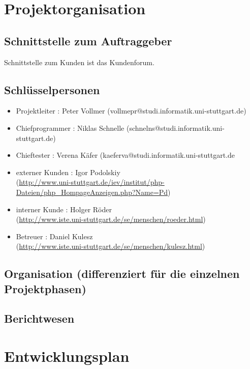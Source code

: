 \documentclass[a4paper,10pt]{scrartcl}
\begin{document}
\section{Projektorganisation}
\subsection{Schnittstelle zum Auftraggeber}
Schnittstelle zum Kunden ist das Kundenforum. 
\subsection{Schlüsselpersonen}
\begin{itemize}
\item
Projektleiter : Peter Vollmer (vollmepr@studi.informatik.uni-stuttgart.de)
\item
Chiefprogrammer : Niklas Schnelle (schnelns@studi.informatik.uni-stuttgart.de)
\item
Chieftester : Verena Käfer (kaeferva@studi.informatik.uni-stuttgart.de
\item
externer Kunden : Igor Podolskiy\\
(\href{http://www.uni-stuttgart.de/iev/institut/php-Dateien/php_HompageAnzeigen.php?Name=Pd}{http://www.uni-stuttgart.de/iev/institut/php-Dateien/php\_HompageAnzeigen.php?Name=Pd})
\item
interner Kunde : Holger Röder\\
(\href{http://www.iste.uni-stuttgart.de/se/menschen/roeder.html}{http://www.iste.uni-stuttgart.de/se/menschen/roeder.html})
\item 
Betreuer : Daniel Kulesz\\
(\href{http://www.iste.uni-stuttgart.de/se/menschen/kulesz.html}{http://www.iste.uni-stuttgart.de/se/menschen/kulesz.html})
\end{itemize}
\subsection{Organisation (differenziert für die einzelnen Projektphasen)}
\subsection{Berichtwesen}

\section{Entwicklungsplan}
\end{document}
